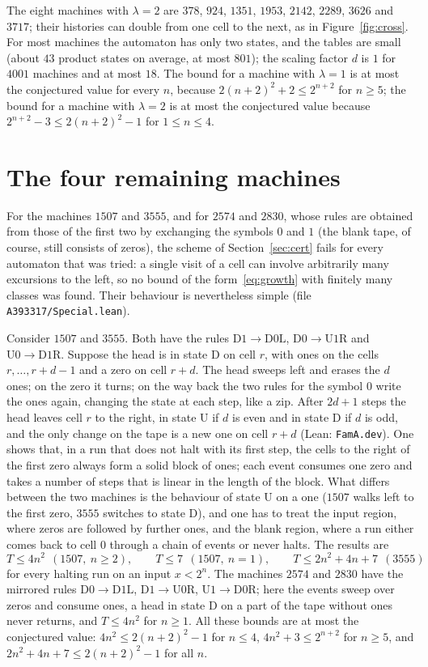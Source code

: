 \documentclass[11pt,a4paper]{amsart}
\theoremstyle{definition}
\theoremstyle{remark}
\newcommand{\U}{\mathrm{U}}
\newcommand{\D}{\mathrm{D}}
\newcommand{\lean}[1]{\texttt{#1}}
\begin{document}
The eight machines with $\lambda=2$ are $378$, $924$, $1351$, $1953$, $2142$, $2289$, $3626$ and $3717$; their
histories can double from one cell to the next, as in Figure~\ref{fig:cross}. For most machines the automaton
has only two states, and the tables are small (about $43$ product states on average, at most $801$);
the scaling factor $d$ is $1$ for $4001$ machines and at most $18$. The bound for a machine with $\lambda=1$ is at
most the conjectured value for every $n$, because $2(n+2)^2+2\le2^{n+2}$ for $n\ge5$; the bound for a machine
with $\lambda=2$ is at most the conjectured value because $2^{n+2}-3\le2(n+2)^2-1$ for $1\le n\le4$.

\section{The four remaining machines}\label{sec:special}

For the machines $1507$ and $3555$, and for $2574$ and $2830$, whose rules are obtained from those of the first
two by exchanging the symbols $0$ and $1$ (the blank tape, of course, still consists of zeros), the scheme of Section~\ref{sec:cert} fails
for every automaton that was tried: a single visit of a cell can involve arbitrarily many excursions to the
left, so no bound of the form~\eqref{eq:growth} with finitely many classes was found. Their behaviour is
nevertheless simple (file \lean{A393317/Special.lean}).

Consider $1507$ and $3555$. Both have the rules $\D1\to\D0\mathrm{L}$, $\D0\to\U1\mathrm{R}$ and
$\U0\to\D1\mathrm{R}$. Suppose the head is in state $\D$ on cell $r$, with ones on the cells $r,\dots,r+d-1$ and a
zero on cell $r+d$. The head sweeps left and erases the $d$ ones; on the zero it turns; on the way back the
two rules for the symbol $0$ write the ones again, changing the state at each step, like a zip. After $2d+1$
steps the head leaves cell $r$ to the right, in state $\U$ if $d$ is even and in state $\D$ if $d$ is odd, and
the only change on the tape is a new one on cell $r+d$ (Lean: \lean{FamA.dev}). One shows that, in a run that does not halt with its first step, the cells to the right of the first zero
always form a solid block of ones; each event consumes one zero and takes a number of steps that is linear in
the length of the block. What differs between the two machines is the behaviour of
state $\U$ on a one ($1507$ walks left to the first zero, $3555$ switches to state $\D$), and one has to treat
the input region, where zeros are followed by further ones, and the blank region, where a run either comes
back to cell $0$ through a chain of events or never halts. The results are
\[ T\le 4n^2 \ \ (1507,\ n\ge2),\qquad T\le 7\ \ (1507,\ n=1),\qquad T\le 2n^2+4n+7\ \ (3555) \]
for every halting run on an input $x<2^n$. The machines $2574$ and $2830$ have the mirrored rules
$\D0\to\D1\mathrm{L}$, $\D1\to\U0\mathrm{R}$, $\U1\to\D0\mathrm{R}$; here the events sweep over zeros and consume
ones, a head in state $\D$ on a part of the tape without ones never returns, and $T\le4n^2$ for $n\ge1$. All
these bounds are at most the conjectured value: $4n^2\le2(n+2)^2-1$ for $n\le4$, $4n^2+3\le2^{n+2}$ for $n\ge5$,
and $2n^2+4n+7\le2(n+2)^2-1$ for all $n$.
\end{document}

